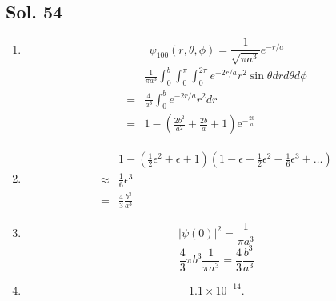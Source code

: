         \subsection*{Sol. 54}
        \begin{enumerate}
            \item $$
            \psi_{100}(r,\theta,\phi)
            =\frac{1}{\sqrt{\pi a^3}}
            e^{-r/a}
            $$
            \begin{align*}
            &\frac{1}{\pi a^3}
                \int_0^b 
                \int_0^\pi 
                \int_0^{2\pi}
                e^{-2r/a}r^2\sin\theta drd\theta 
                d\phi\\
                =&\frac{4}{a^3}
                \int_0^b 
                e^{-2r/a}r^2 dr\\
                =&
                1 - 
                (\frac{2b^2}{a^2} + \frac{2b}{a}+1)\mathrm{e}^{-\frac{2b}{a}}
            \end{align*}
            \item 
            \begin{align*}
                &1 - (\frac{1}{2}\epsilon^2 + \epsilon + 1)
                (1-\epsilon + \frac{1}{2}\epsilon^2-\frac{1}{6}\epsilon^3+\dots)\\
                \approx &
                \frac{1}{6}\epsilon^3\\
                =&\frac{4}{3}\frac{b^3}{a^3}
            \end{align*}
            \item $$
            |\psi(0)|^2
            =\frac{1}{\pi a^3}
            $$
            $$
            \frac{4}{3}\pi b^3
            \frac{1}{\pi a^3} = 
            \frac{4}{3}\frac{b^3}{a^3}
            $$
            \item 
            $$
            1.1\times 10^{-14}.
            $$
        \end{enumerate}
